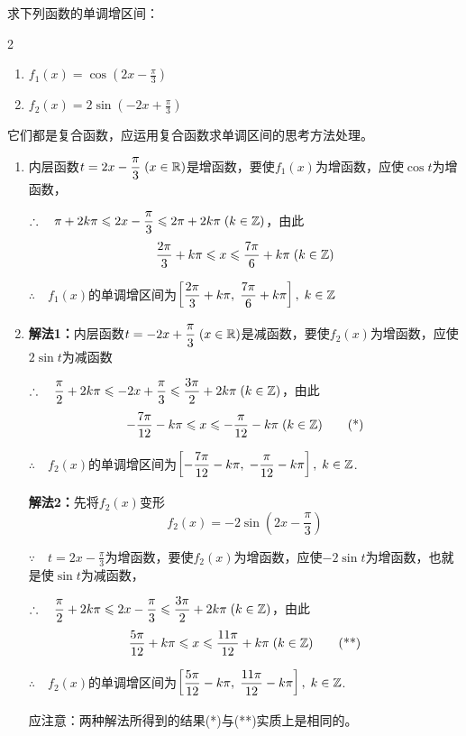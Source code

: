 \begin{example}
求下列函数的单调增区间：
\begin{multicols}{2}
\begin{enumerate}[(1)]
    \item $f_1(x)=\cos\left(2x-\frac{\pi}{3}\right)$
    \item $f_2(x)=2\sin\left(-2x+\frac{\pi}{3}\right)$
\end{enumerate}
\end{multicols}
\end{example}

\begin{analyze}
它们都是复合函数，应运用复合函数求单调区间的思考方法处理。
\end{analyze}

\begin{solution}
\begin{enumerate}[(1)]
    \item 内层函数$t=2x-\dfrac{\pi}{3}\; (x\in\mathbb{R})$是增函数，要使$f_1(x)$为增函数，应使$\cos t$为增函数，

$\therefore\quad \pi+2k\pi\leqslant 2x-\dfrac{\pi}{3}\leqslant 2\pi+2k\pi\; (k\in\mathbb{Z})$，由此
\[\dfrac{2\pi}{3}+ k\pi\leqslant x \leqslant \dfrac{7\pi}{6}+k\pi\; (k\in\mathbb{Z})\]

$\therefore\quad f_1(x)$的单调增区间为$\left[\dfrac{2\pi}{3}+k\pi,\; \dfrac{7\pi}{6}+k\pi\right],\; k\in\mathbb{Z}$

\item \textbf{解法1：}内层函数$t=-2x+\dfrac{\pi}{3}\; (x\in\mathbb{R})$是减函数，要使$f_2(x)$为增函数，应使$2\sin t$为减函数

$\therefore\quad \dfrac{\pi}{2}+2k\pi\leqslant -2x+\dfrac{\pi}{3}\leqslant \dfrac{3\pi}{2}+2k\pi\; (k\in\mathbb{Z})$，由此
\begin{equation}
    -\dfrac{7\pi}{12}-k\pi\leqslant x \leqslant -\dfrac{\pi}{12}-k\pi\; (k\in\mathbb{Z})  \tag{*}
\end{equation}

$\therefore\quad f_2(x)$的单调增区间为$\left[-\dfrac{7\pi}{12}-k\pi,\; -\dfrac{\pi}{12}-k\pi\right],\; k\in\mathbb{Z}$.

\textbf{解法2：}先将$f_2(x)$变形
\[f_2(x)=-2\sin\left(2x-\frac{\pi}{3}\right)\]

$\because\quad t=2x-\frac{\pi}{3}$为增函数，要使$f_2(x)$为增函数，应使$-2\sin t$为增函数，也就是使$\sin t$为减函数，

$\therefore\quad \dfrac{\pi}{2}+2k\pi\leqslant 2x-\dfrac{\pi}{3}\leqslant \dfrac{3\pi}{2}+2k\pi\; (k\in\mathbb{Z})$，由此
\begin{equation}
    \dfrac{5\pi}{12}+k\pi\leqslant x\leqslant \dfrac{11\pi}{12}+k\pi\; (k\in\mathbb{Z})\tag{**}
\end{equation}

$\therefore\quad f_2(x)$的单调增区间为$\left[\dfrac{5\pi}{12}-k\pi,\; \dfrac{11\pi}{12}-k\pi\right],\; k\in\mathbb{Z}$.

应注意：两种解法所得到的结果(*)与(**)实质上是相同的。
\end{enumerate}    
\end{solution}

